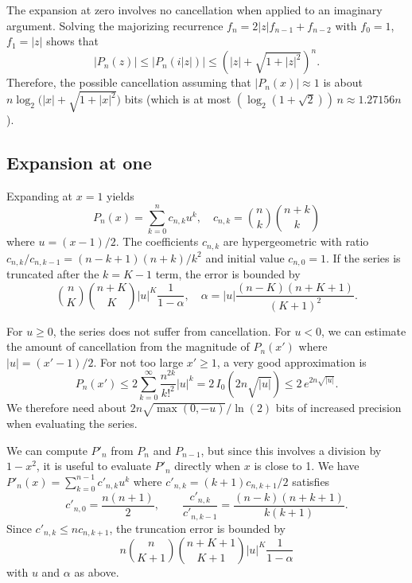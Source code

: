 \documentclass{siamart0216}
\begin{document}
The expansion at zero involves no cancellation
when applied to an imaginary argument.
Solving the majorizing recurrence $f_n = 2 |z| f_{n-1} + f_{n-2}$ with
$f_0 = 1$, $f_1 = |z|$ shows that
\[ |P_n(z)| \le |P_n(i|z|)| \le \left(|z| + \sqrt{1 + |z|^2}\right)^n. \]
Therefore, the possible cancellation assuming that $|P_n(x)| \approx 1$
is about $n \log_2\bigl(|x| + \sqrt{1 + |x|^2}\bigr)$ bits
(which is at most $(\log_2 (1+\sqrt{2})) \, n \approx 1.27156n$).

\subsection{Expansion at one}

\label{sec:series-one}

Expanding at $x = 1$ yields
$$P_n(x) = \sum_{k=0}^n c_{n,k} u^k, \quad c_{n,k} = {n \choose k} {n+k \choose k}$$
where $u = (x-1)/2$.
The coefficients $c_{n,k}$ are hypergeometric with
ratio $c_{n,k}/c_{n,k-1} = (n-k+1)(n+k)/k^2$
and initial value $c_{n,0} = 1$.
If the series is truncated after the $k = K - 1$ term,
the error is bounded by
\begin{equation}
\label{eq:truncerr2}
{n \choose K}{n+K \choose K} |u|^K \frac{1}{1-\alpha}, \quad \alpha = |u| \frac{(n-K)(n+K+1)}{(K+1)^2}.
\end{equation}

For $u \ge 0$, the series does not suffer from cancellation.
For $u < 0$, we can estimate the amount of
cancellation from the magnitude of $P_n(x')$ where $|u| = (x'-1)/2$.
For not too large $x' \ge 1$, a very good approximation is
\[ P_n(x') \leq 2 \sum_{k=0}^{\infty} \frac{n^{2k}}{k!^2} |u|^k
           = 2\,I_0(2n\sqrt{|u|})
           \leq 2\,e^{2n\sqrt{|u|}}. \]
We therefore need about $2n\sqrt{\max(0,-u)} / \ln(2)$ bits
of increased precision when evaluating the series.

We can compute $P'_n$ from $P_n$ and $P_{n-1}$, but since this
involves a division by $1-x^2$, it is useful to
evaluate $P'_n$ directly when $x$ is close to 1.
We have
$P'_n(x) = \sum_{k=0}^{n-1} c'_{n,k} u^k$
where $c'_{n,k} = (k+1) c_{n,k+1} / 2$ satisfies
\[
  c'_{n,0} = \frac{n(n+1)}{2}, \qquad
  \frac{c'_{n,k}}{c'_{n,k-1}} = \frac{(n-k)(n+k+1)}{k(k+1)}.
\]
Since $c'_{n,k} \le n c_{n,k+1}$, the truncation error is bounded by
\begin{equation}
\label{eq:truncerr2b}
n {n \choose K+1}{n+K+1 \choose K+1} |u|^K \frac{1}{1-\alpha}
\end{equation}
with $u$ and $\alpha$ as above.
\end{document}
